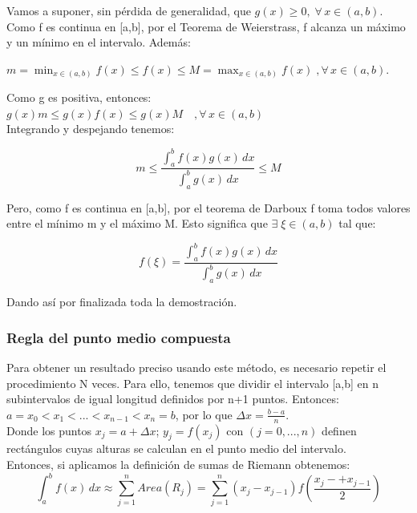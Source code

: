 \documentclass{article}
\begin{document}
			Vamos a suponer, sin pérdida de generalidad, que 
			$g(x)\geq 0,\;\forall\, x \in (a,b)$. \\

			Como f es continua en [a,b], por el Teorema de Weierstrass, f alcanza un máximo y un mínimo en el intervalo. Además:

	\begin{center}
	$m =\min_{x \in (a,b)}f(x) \leq f(x) \leq M =\max_{x \in (a,b)}f(x) \;, \forall\, x \in (a,b)$.
	\end{center}
			
			Como g es positiva, entonces:
			$g(x)m \leq g(x)f(x) \leq g(x)M\quad ,\forall\, x \in (a,b)$ \\

			Integrando y despejando tenemos:
			
			\begin{equation}
				m \leq \frac{\int_{a}^{b} f(x)g(x) \,dx }{\int_{a}^{b} g(x) \,dx } \leq M 
			\end{equation}
			
			Pero, como f es continua en [a,b], por el teorema de Darboux f toma todos  valores entre el mínimo m y el máximo M.  Esto significa que $\exists\; \xi \in (a,b)$ tal que:
			
			\begin{equation}
				f(\xi)=\frac{\int_{a}^{b} f(x)g(x) \,dx }{\int_{a}^{b} g(x) \,dx }
			\end{equation}
			
			Dando así por finalizada toda la demostración.\\
			
			\subsubsection{Regla del punto medio compuesta}
			
			Para obtener un resultado preciso usando este método, es necesario repetir el procedimiento N veces. Para ello, tenemos que  dividir el intervalo [a,b] en n subintervalos de igual longitud definidos por n+1 puntos. Entonces: $a=x_0<x_1<...<x_{n-1}<x_n=b$, por lo que $\Delta x=\frac{b-a}{n}$. \\
			
			Donde los puntos $x_j=a+\Delta x$; $y_j=f(x_j)$ con $(j=0,...,n)$ definen  rectángulos cuyas alturas se calculan en el punto medio del intervalo. \\
			
			Entonces, si aplicamos la definición de sumas de Riemann obtenemos:
			\begin{equation}
				\int_{a}^{b} f(x) \,dx \approx \sum_{j = 1}^{n} Area(R_j)=\sum_{j = 1}^{n} (x_j-x_{j-1})f(\frac{x_j-+x_{j-1}}{2} )   
			\end{equation}
			
\end{document}
